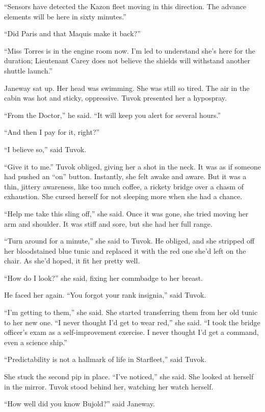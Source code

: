 \documentclass[twoside,letterpaper,12pt]{memoir}
\begin{document}
``Sensors have detected the Kazon fleet moving in this direction. The advance elements will be here in sixty minutes.''

``Did Paris and that Maquis make it back?''

``Miss Torres is in the engine room now. I'm led to understand she's here for the duration; Lieutenant Carey does not believe the shields will withstand another shuttle launch.''

Janeway sat up. Her head was swimming. She was still so tired. The air in the cabin was hot and sticky, oppressive. Tuvok presented her a hypospray.

``From the Doctor,'' he said. ``It will keep you alert for several hours.''

``And then I pay for it, right?''

``I believe so,'' said Tuvok.

``Give it to me.'' Tuvok obliged, giving her a shot in the neck. It was as if someone had pushed an ``on'' button. Instantly, she felt awake and aware. But it was a thin, jittery awareness, like too much coffee, a rickety bridge over a chasm of exhaustion. She cursed herself for not sleeping more when she had a chance.

``Help me take this sling off,'' she said. Once it was gone, she tried moving her arm and shoulder. It was stiff and sore, but she had her full range.

``Turn around for a minute,'' she said to Tuvok. He obliged, and she stripped off her bloodstained blue tunic and replaced it with the red one she'd left on the chair. As she'd hoped, it fit her pretty well.

``How do I look?'' she said, fixing her commbadge to her breast.

He faced her again. ``You forgot your rank insignia,'' said Tuvok.

``I'm getting to them,'' she said. She started transferring them from her old tunic to her new one. ``I never thought I'd get to wear red,'' she said. ``I took the bridge officer's exam as a self-improvement exercise. I never thought I'd get a command, even a science ship.''

``Predictability is not a hallmark of life in Starfleet,'' said Tuvok.

She stuck the second pip in place. ``I've noticed,'' she said. She looked at herself in the mirror. Tuvok stood behind her, watching her watch herself.

``How well did you know Bujold?'' said Janeway.
\end{document}
